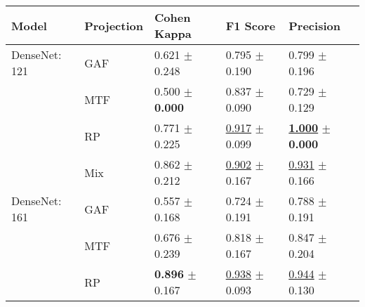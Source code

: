 
\begin{tabular}{lllll}
\toprule
Model & Projection & Cohen Kappa & F1 Score & Precision \\
\midrule
DenseNet: 121 & GAF & \textcolor[rgb]{0.6608933455,0.3391066545,0}{0.621} $\pm$ \textcolor[rgb]{0.9041130657,0.0958869343,0}{0.248} & \textcolor[rgb]{0.6082844097,0.3917155903,0}{0.795} $\pm$ \textcolor[rgb]{0.8643144405,0.1356855595,0}{0.190} & \textcolor[rgb]{0.6744186047,0.3255813953,0}{0.799} $\pm$ \textcolor[rgb]{0.5590408937,0.4409591063,0}{0.196} \\
 & MTF & \textcolor[rgb]{0.9525979945,0.0474020055,0}{0.500} $\pm$ \textbf{\textcolor[rgb]{0.0000000000,0.5000000000,0}{0.000}} & \textcolor[rgb]{0.4337899543,0.5000000000,0}{0.837} $\pm$ \textcolor[rgb]{0.2073760791,0.5000000000,0}{0.090} & \textcolor[rgb]{0.9069767442,0.0930232558,0}{0.729} $\pm$ \textcolor[rgb]{0.3669781154,0.5000000000,0}{0.129} \\
 & RP & \textcolor[rgb]{0.3008204193,0.5000000000,0}{0.771} $\pm$ \textcolor[rgb]{0.8198234888,0.1801765112,0}{0.225} & \underline{\textcolor[rgb]{0.1043705153,0.5000000000,0}{0.917}} $\pm$ \textcolor[rgb]{0.2718715508,0.5000000000,0}{0.099} & \underline{\textbf{\textcolor[rgb]{0.0000000000,0.5000000000,0}{1.000}}} $\pm$ \textbf{\textcolor[rgb]{0.0000000000,0.5000000000,0}{0.000}} \\
 & Mix & \textcolor[rgb]{0.0802187785,0.5000000000,0}{0.862} $\pm$ \textcolor[rgb]{0.7731356242,0.2268643758,0}{0.212} & \underline{\textcolor[rgb]{0.1679712981,0.5000000000,0}{0.902}} $\pm$ \textcolor[rgb]{0.7127121360,0.2872878640,0}{0.167} & \underline{\textcolor[rgb]{0.2325581395,0.5000000000,0}{0.931}} $\pm$ \textcolor[rgb]{0.4733152883,0.5000000000,0}{0.166} \\
DenseNet: 161 & GAF & \textcolor[rgb]{0.8155575813,0.1844424187,0}{0.557} $\pm$ \textcolor[rgb]{0.6127939876,0.3872060124,0}{0.168} & \textcolor[rgb]{0.9001956947,0.0998043053,0}{0.724} $\pm$ \textcolor[rgb]{0.8705294077,0.1294705923,0}{0.191} & \textcolor[rgb]{0.7103594080,0.2896405920,0}{0.788} $\pm$ \textcolor[rgb]{0.5454934107,0.4545065893,0}{0.191} \\
 & MTF & \textcolor[rgb]{0.5296262534,0.4703737466,0}{0.676} $\pm$ \textcolor[rgb]{0.8718566415,0.1281433585,0}{0.239} & \textcolor[rgb]{0.5136986301,0.4863013699,0}{0.818} $\pm$ \textcolor[rgb]{0.7123620115,0.2876379885,0}{0.167} & \textcolor[rgb]{0.5116279070,0.4883720930,0}{0.847} $\pm$ \textcolor[rgb]{0.5804275230,0.4195724770,0}{0.204} \\
 & RP & \textbf{\textcolor[rgb]{0.0000000000,0.5000000000,0}{0.896}} $\pm$ \textcolor[rgb]{0.6087717266,0.3912282734,0}{0.167} & \underline{\textcolor[rgb]{0.0195694716,0.5000000000,0}{0.938}} $\pm$ \textcolor[rgb]{0.2275213798,0.5000000000,0}{0.093} & \underline{\textcolor[rgb]{0.1860465116,0.5000000000,0}{0.944}} $\pm$ \textcolor[rgb]{0.3698791733,0.5000000000,0}{0.130} \\

\end{tabular}
